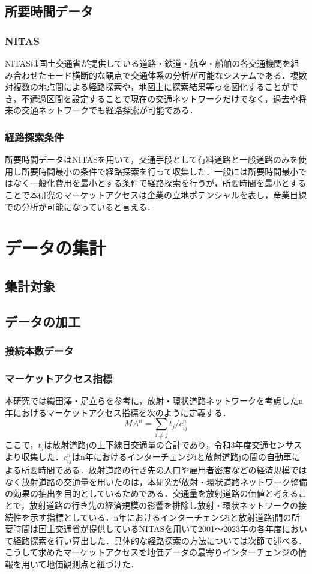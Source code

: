 \subsection{所要時間データ}
\subsubsection{NITAS}
NITASは国土交通省が提供している道路・鉄道・航空・船舶の各交通機関を組み合わせたモード横断的な観点で交通体系の分析が可能なシステムである．複数対複数の地点間による経路探索や，地図上に探索結果等っを図化することができ，不通過区間を設定することで現在の交通ネットワークだけでなく，過去や将来の交通ネットワークでも経路探索が可能である．\cite{NITAS}
\subsubsection{経路探索条件}
所要時間データはNITASを用いて，交通手段として有料道路と一般道路のみを使用し所要時間最小の条件で経路探索を行って収集した．一般には所要時間最小ではなく一般化費用を最小とする条件で経路探索を行うが，所要時間を最小とすることで本研究のマーケットアクセスは企業の立地ポテンシャルを表し，産業目線での分析が可能になっていると言える．
\section{データの集計}
\subsection{集計対象}
\subsection{データの加工}
\subsubsection{接続本数データ}
\subsubsection{マーケットアクセス指標}
本研究では織田澤・足立らを参考に，放射・環状道路ネットワークを考慮したn年におけるマーケットアクセス指標を次のように定義する．
\[MA^{n} = \sum_{i \neq j}{t_{j}/c^{n}_{ij}}\]
ここで，$t_{j}$は放射道路jの上下線日交通量の合計であり，令和3年度交通センサスより収集した．$c^{n}_{ij}$はn年におけるインターチェンジiと放射道路jの間の自動車による所要時間である．放射道路の行き先の人口や雇用者密度などの経済規模ではなく放射道路の交通量を用いたのは，本研究が放射・環状道路ネットワーク整備の効果の抽出を目的としているためである．交通量を放射道路の価値と考えることで，放射道路の行き先の経済規模の影響を排除し放射・環状ネットワークの接続性を示す指標としている．n年におけるインターチェンジiと放射道路j間の所要時間は国土交通省が提供しているNITASを用いて2001〜2023年の各年度において経路探索を行い算出した．具体的な経路探索の方法については次節で述べる．こうして求めたマーケットアクセスを地価データの最寄りインターチェンジの情報を用いて地価観測点と紐づけた．

